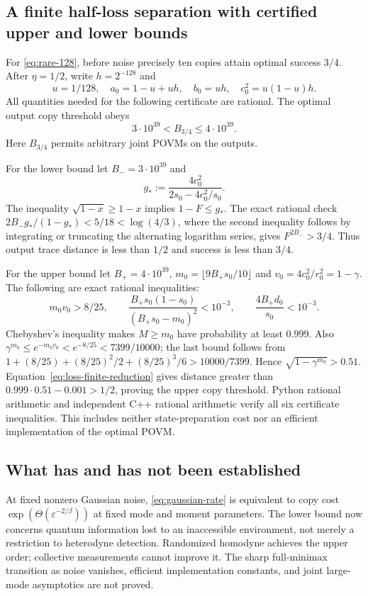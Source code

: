 \subsection{A finite half-loss separation with certified upper and lower bounds}
For \eqref{eq:rare-128}, before noise precisely ten copies attain optimal
success $3/4$. After $\eta=1/2$, write $h=2^{-128}$ and
\[
 u=1/128,\quad a_0=1-u+uh,\quad b_0=uh,\quad c_0^2=u(1-u)h.
\]
All quantities needed for the following certificate are rational.
The optimal output copy threshold obeys
\[
 \boxed{3\cdot10^{39}<B_{3/4}\le4\cdot10^{39}.}
 \tag{D.17}\label{eq:loss-128-finite}
\]
Here $B_{3/4}$ permits arbitrary joint POVMs on the outputs.

For the lower bound let $B_-=3\cdot10^{39}$ and
\[
 g_*:=\frac{4c_0^2}{2s_0-4c_0^2/s_0}.
\]
The inequality $\sqrt{1-x}\ge1-x$ implies $1-F\le g_*$.
The exact rational check
$2B_-g_* /(1-g_*)<5/18<\log(4/3)$, where the second inequality follows by
integrating or truncating the alternating logarithm series, gives
$F^{2B_-}>3/4$. Thus output trace distance is less than $1/2$ and success is
less than $3/4$.

For the upper bound let $B_+=4\cdot10^{39}$,
$m_0=\lfloor9B_+s_0/10\rfloor$ and $v_0=4c_0^2/r_0^2=1-\gamma$.
The following are exact rational inequalities:
\[
 m_0v_0>8/25,\qquad
 \frac{B_+s_0(1-s_0)}{(B_+s_0-m_0)^2}<10^{-3},\qquad
 \frac{4B_+d_0}{s_0}<10^{-3}.
\]
Chebyshev's inequality makes $M\ge m_0$ have probability at least $0.999$.
Also $\gamma^{m_0}\le e^{-m_0v_0}<e^{-8/25}<7399/10000$; the last bound
follows from
$1+(8/25)+(8/25)^2/2+(8/25)^3/6>10000/7399$.
Hence $\sqrt{1-\gamma^{m_0}}>0.51$. Equation~\eqref{eq:loss-finite-reduction}
gives distance greater than $0.999\cdot0.51-0.001>1/2$, proving the upper
copy threshold. Python rational arithmetic and independent C++ rational
arithmetic verify all six certificate inequalities. This includes neither
state-preparation cost nor an efficient implementation of the optimal POVM.

\subsection{What has and has not been established}
At fixed nonzero Gaussian noise, \eqref{eq:gaussian-rate} is equivalent to
copy cost $\exp(\Theta(\varepsilon^{-2/\beta}))$ at fixed mode and moment
parameters. The lower bound now concerns quantum information lost to an
inaccessible environment, not merely a restriction to heterodyne detection.
Randomized homodyne achieves the upper order; collective measurements cannot
improve it. The sharp full-minimax transition as noise vanishes, efficient implementation
constants, and joint large-mode asymptotics are not proved.

